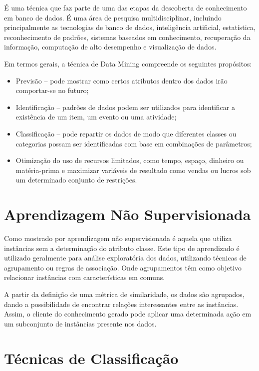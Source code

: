 \documentclass[
	12pt,				%
	openright,			%
	oneside,	
	a4paper,				%
	english,				%
	brazil				%
]{abntex2/abntex2} %
\begin{document}
		É uma técnica que faz parte de uma das etapas da descoberta de conhecimento em banco de dados. É uma área de pesquisa multidisciplinar, incluindo principalmente as tecnologias de banco de dados, inteligência artificial, estatística, reconhecimento de padrões, sistemas baseados em conhecimento, recuperação da informação, computação de alto desempenho e visualização de dados.
		
		Em termos gerais, a técnica de Data Mining compreende os seguintes propósitos:
		
		\begin{itemize}
			\item Previsão – pode mostrar como certos atributos dentro dos dados irão comportar-se no futuro;
			\item Identificação – padrões de dados podem ser utilizados para identificar a existência de um item, um evento ou uma atividade;
			\item Classificação – pode repartir os dados de modo que diferentes classes ou categorias possam ser identificadas com base em combinações de parâmetros;
			\item Otimização do uso de recursos limitados, como tempo, espaço, dinheiro ou matéria-prima e maximizar variáveis de resultado como vendas ou lucros sob um determinado conjunto de restrições.
		\end{itemize}
		
	\section{Aprendizagem Não Supervisionada}
	
		Como mostrado por \cite{damasceno:2005} aprendizagem não supervisionada é aquela que utiliza instâncias sem a determinação do atributo classe. Este  tipo de aprendizado é utilizado geralmente para análise exploratória dos dados, utilizando técnicas de  agrupamento ou regras de associação. Onde agrupamentos têm como objetivo relacionar instâncias com características em comuns.
		
		A partir da definição de uma métrica de similaridade, os dados são  agrupados, dando a possibilidade de encontrar relações interessantes entre as instâncias. Assim, o cliente do conhecimento gerado pode aplicar uma determinada ação em um subconjunto de instâncias presente nos  dados. 
		
	\section{Técnicas de Classificação}
	
\end{document}
